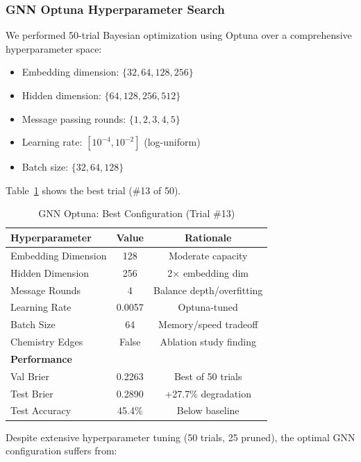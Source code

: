 \subsubsection{GNN Optuna Hyperparameter Search}

We performed 50-trial Bayesian optimization using Optuna \citep{akiba2019optuna} over a comprehensive hyperparameter space:

\begin{itemize}
    \item Embedding dimension: $\{32, 64, 128, 256\}$
    \item Hidden dimension: $\{64, 128, 256, 512\}$
    \item Message passing rounds: $\{1, 2, 3, 4, 5\}$
    \item Learning rate: $[10^{-4}, 10^{-2}]$ (log-uniform)
    \item Batch size: $\{32, 64, 128\}$
\end{itemize}

Table~\ref{tab:gnn-optuna-best} shows the best trial (\#13 of 50).

\begin{table}[h]
\centering
\caption{GNN Optuna: Best Configuration (Trial \#13)}
\label{tab:gnn-optuna-best}
\begin{tabular}{lcc}
\toprule
\textbf{Hyperparameter} & \textbf{Value} & \textbf{Rationale} \\
\midrule
Embedding Dimension & 128 & Moderate capacity \\
Hidden Dimension & 256 & 2$\times$ embedding dim \\
Message Rounds & 4 & Balance depth/overfitting \\
Learning Rate & 0.0057 & Optuna-tuned \\
Batch Size & 64 & Memory/speed tradeoff \\
Chemistry Edges & False & Ablation study finding \\
\midrule
\multicolumn{3}{l}{\textbf{Performance}} \\
Val Brier & 0.2263 & Best of 50 trials \\
Test Brier & 0.2890 & +27.7\% degradation \\
Test Accuracy & 45.4\% & Below baseline \\
\bottomrule
\end{tabular}
\end{table}

Despite extensive hyperparameter tuning (50 trials, 25 pruned), the optimal GNN configuration suffers from:

